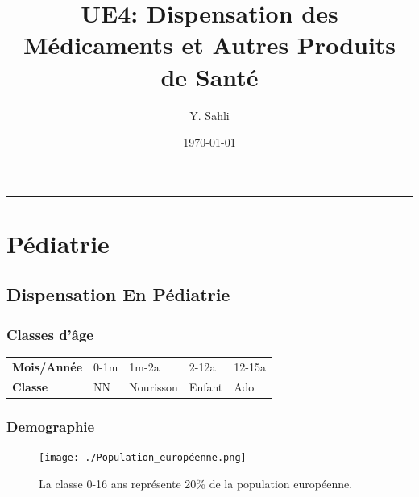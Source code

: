 \documentclass[11pt]{article}
\author{Y. Sahli}
\date{\today}
\title{UE4: Dispensation des Médicaments et Autres Produits de Santé}
\begin{document}
\maketitle
\tableofcontents

\setlength{\parindent}{0pt}

\noindent\rule{\textwidth}{0.5pt}
\section{Pédiatrie}
\label{sec:orgcad67e9}
\setlength{\parindent}{0pt}
\subsection{Dispensation En Pédiatrie}
\label{sec:org74f78b0}
\subsubsection{Classes d'âge}
\label{sec:org8b4356c}
\begin{center}
\begin{tabular}{lllll}
\textbf{Mois/Année} & 0-1m & 1m-2a & 2-12a & 12-15a\\
\textbf{Classe} & NN\footnotemark & Nourisson & Enfant & Ado\\
\end{tabular}
\end{center}
\subsubsection{Demographie}
\label{sec:org5b9133b}
\begin{figure}[htbp]
\centering
\texttt{[image: ./Population\_européenne.png]}
\caption{La classe 0-16 ans représente 20\% de la population européenne.}
\end{figure}
\end{document}
